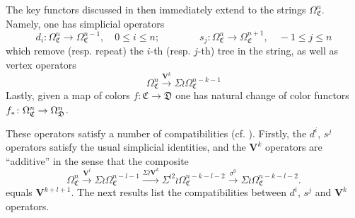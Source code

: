 \documentclass[a4paper,10pt
,draft
]{article}%
\renewcommand{\1}{\eta}%
\begin{document}
The key functors discussed in \cite[\S 3.4]{BP_geo} then immediately extend to the strings
$\Omega_{\mathfrak{C}}^n$. Namely, one has simplicial operators
\[
d_i \colon \Omega_{\mathfrak{C}}^n \to \Omega_{\mathfrak{C}}^{n-1},
\quad 0 \leq i \leq n;
\qquad \qquad
s_j \colon \Omega_{\mathfrak{C}}^{n} \to \Omega_{\mathfrak{C}}^{n+1},
\quad -1 \leq j \leq n
\]
which remove (resp. repeat) the $i$-th (resp. $j$-th) tree in the string,
as well as vertex operators
\[
\Omega^{n}_{\mathfrak{C}}
\xrightarrow{\boldsymbol{V}^k}
\Sigma \wr \Omega^{n-k-1}_{\mathfrak{C}}
\]
Lastly, given a map of colors 
$f \colon \mathfrak{C} \to \mathfrak{D}$
one has natural change of color functors
$f_{\**} \colon \Omega^n_{\mathfrak{C}} \to \Omega^n_{\mathfrak{D}}$.



These operators satisfy a number of compatibilities (cf. \cite[Prop. 3.90]{BP_geo}). Firstly, the $d^i$, $s^j$ operators satisfy the usual simplicial identities, 
and the $\boldsymbol{V}^k$ operators are ``additive'' in the sense that
the composite
\begin{equation}\label{VKADD EQ}
	\Omega^{n}_{\mathfrak{C}} \xrightarrow{\boldsymbol{V}^l} 
	\Sigma \wr \Omega^{n-l-1}_{\mathfrak{C}} \xrightarrow{\Sigma \wr \boldsymbol{V}^k}
	\Sigma^{\wr 2} \wr \Omega^{n-k-l-2}_{\mathfrak{C}} \xrightarrow{\sigma^0}
	\Sigma \wr \Omega^{n-k-l-2}_{\mathfrak{C}}.
\end{equation}
equals $\boldsymbol{V}^{k+l+1}$.
The next results list the compatibilities between $d^i$, $s^j$ and $\boldsymbol{V}^k$ operators.
\end{document}
